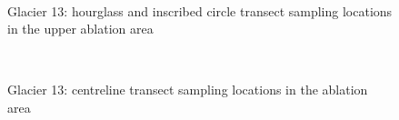 \documentclass{sfuthesis}
\begin{document}
{\begin{appendices}
\begin{figure}[H]
	\\
\caption[]{Glacier 13: hourglass and inscribed circle transect sampling locations in the upper ablation area}
\end{figure}
	\begin{figure}[H]
	\centering
	\\
\caption[]{Glacier 13: centreline transect sampling locations in the ablation area}
\end{figure}
	\begin{figure}[H]
	\centering

\end{figure}
\end{appendices}}
\end{document}
